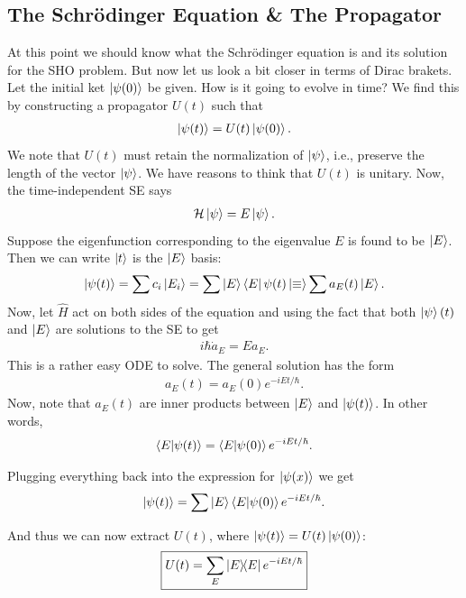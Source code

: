 \documentclass{book}
\theoremstyle{definition}
\newcommand{\ham}{\mathcal{H}}
\begin{document}
\subsection{The Schr\"{o}dinger Equation \& The Propagator}

At this point we should know what the Schr\"{o}dinger equation is and its solution for the SHO problem. But now let us look a bit closer in terms of Dirac brakets. Let the initial ket $\ket{\psi(0)}$ be given. How is it going to evolve in time? We find this by constructing a propagator $U(t)$ such that
\begin{align}
\ket{\psi(t)} = U(t)\ket{\psi(0)}.
\end{align}
We note that $U(t)$ must retain the normalization of $\ket{\psi}$, i.e., preserve the length of the vector $\ket{\psi}$. We have reasons to think that $U(t)$ is unitary. Now, the time-independent SE says
\begin{align}
\ham\ket{\psi} = E\ket{\psi}.
\end{align}
Suppose the eigenfunction corresponding to the eigenvalue $E$ is found to be $\ket{E}$. Then we can write $\ket{t}$ is the $\ket{E}$ basis:
\begin{align}
\ket{\psi(t)} = \sum c_i \ket{E_i} = \sum\ket{E} \bra{E}\psi(t)\ket \equiv \sum a_E(t)\ket{E}.
\end{align}
Now, let $\hat{H}$ act on both sides of the equation and using the fact that both $\ket\psi(t)$ and $\ket{E}$ are solutions to the SE to get
\begin{align}
i\hbar \dot{a}_E = Ea_E.
\end{align}
This is a rather easy ODE to solve. The general solution has the form
\begin{align}
a_E(t) = a_E(0)e^{-iEt/\hbar}.
\end{align}
Now, note that $a_E(t)$ are inner products between $\ket{E}$ and $\ket{\psi(t)}$. In other words, 
\begin{align}
\braket{E}{\psi(t)} = \braket{E}{\psi(0)}e^{-iEt/\hbar}.
\end{align}

Plugging everything back into the expression for $\ket{\psi(x)}$ we get
\begin{align}
\ket{\psi(t)} = \sum \ket{E}  \braket{E}{\psi(0)} e^{-iEt/\hbar}.
\end{align}


And thus we can now extract $U(t)$, where $\ket{\psi(t)} = U(t)\ket{\psi(0)}$:
\begin{align}\label{propagator}
\boxed{U(t) = \sum_E \ketbra{E}{E}e^{-iEt/\hbar}}
\end{align}
\end{document}
